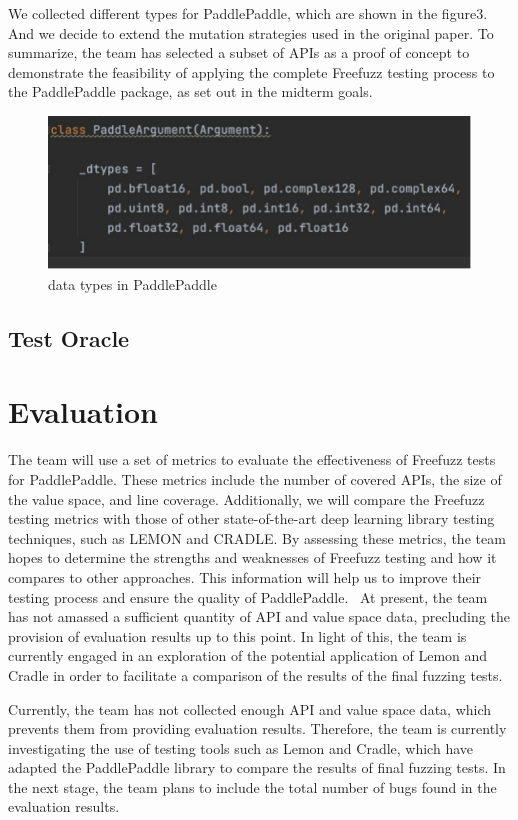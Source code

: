 \documentclass[sigconf]{acmart}
\begin{document}
  We collected different types for PaddlePaddle, which are shown in the figure3. 
  And we decide to extend the mutation strategies used in the original paper.
  To summarize, the team has selected a subset of APIs as a proof of concept to 
  demonstrate the feasibility of applying the complete Freefuzz testing process to the PaddlePaddle package, 
  as set out in the midterm goals.
  \begin{figure}[h]
    \centering
    \includegraphics[width=\linewidth]{4.png}
    \caption{data types in PaddlePaddle}
  \end{figure}







  
  \subsection{Test Oracle}


\section{Evaluation}
The team will use a set of metrics to evaluate the effectiveness of Freefuzz tests for PaddlePaddle. 
These metrics include the number of covered APIs, the size of the value space, and line coverage. 
Additionally, we will compare the Freefuzz testing metrics with those of other state-of-the-art deep learning library testing techniques,
 such as LEMON and CRADLE. By assessing these metrics, the team hopes to determine the strengths and weaknesses of Freefuzz testing and how it compares to other approaches.
  This information will help us to improve their testing process and ensure the quality of PaddlePaddle.
 At present, the team has not amassed a sufficient quantity of API and value space data, precluding the provision of evaluation results up to this point. In light of this, 
the team is currently engaged in an exploration of the potential application of Lemon and Cradle in order to facilitate a comparison of the results of the final fuzzing tests.
\par Currently, the team has not collected enough API and value space data, which prevents them from providing evaluation results.
 Therefore, the team is currently investigating the use of testing tools such as Lemon and Cradle, which have adapted the PaddlePaddle library 
 to compare the results of final fuzzing tests. In the next stage, the team plans to include the total number of bugs found in the evaluation results.
\end{document}
